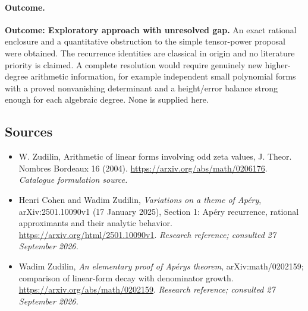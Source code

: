 \documentclass[11pt,a4paper]{article}
\numberwithin{equation}{section}
\begin{document}
\paragraph{Outcome.}
\textbf{Outcome: Exploratory approach with unresolved gap.}
An exact rational enclosure and a quantitative obstruction to the simple tensor-power proposal were obtained. The recurrence identities are classical in origin and no literature priority is claimed. A complete resolution would require genuinely new higher-degree arithmetic information, for example independent small polynomial forms with a proved nonvanishing determinant and a height/error balance strong enough for each algebraic degree. None is supplied here.

\subsection{Sources}
\begin{itemize}\raggedright
\item[\textnormal{[S1]}]\hypertarget{source:1283:1}{} W. Zudilin, Arithmetic of linear forms involving odd zeta values, J. Theor. Nombres Bordeaux 16 (2004).
\url{https://arxiv.org/abs/math/0206176}.
{\small\textit{Catalogue formulation source.}}
\item[\textnormal{[E1]}]\hypertarget{extra:1283:1}{} Henri Cohen and Wadim Zudilin, \emph{Variations on a theme of Ap\'ery}, arXiv:2501.10090v1 (17 January 2025), Section 1: Ap\'ery recurrence, rational approximants and their analytic behavior.
\url{https://arxiv.org/html/2501.10090v1}.
{\small\textit{Research reference; consulted 27 September 2026.}}
\item[\textnormal{[E2]}]\hypertarget{extra:1283:2}{} Wadim Zudilin, \emph{An elementary proof of Ap\'ery\textquotesingle s theorem}, arXiv:math/0202159; comparison of linear-form decay with denominator growth.
\url{https://arxiv.org/abs/math/0202159}.
{\small\textit{Research reference; consulted 27 September 2026.}}
\end{itemize}
\end{document}
